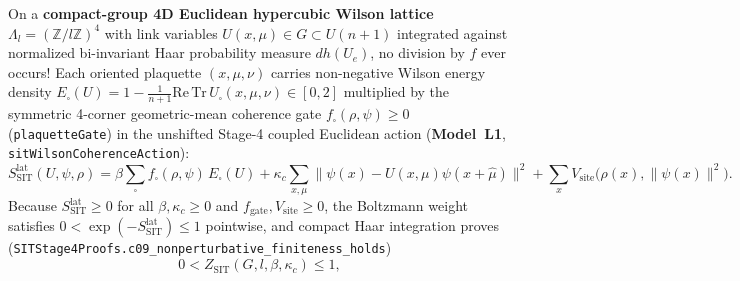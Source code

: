 On a \textbf{compact-group 4D Euclidean hypercubic Wilson lattice} $\Lambda_l = (\mathbb{Z}/l\mathbb{Z})^4$ with link variables $U(x,\mu) \in G \subset U(n+1)$ integrated against normalized bi-invariant Haar probability measure $dh(U_e)$, no division by $f$ ever occurs! Each oriented plaquette $(x,\mu,\nu)$ carries non-negative Wilson energy density $E_\square(U) = 1 - \frac{1}{n+1}\mathrm{Re}\,\mathrm{Tr}\,U_\square(x,\mu,\nu) \in [0, 2]$ multiplied by the symmetric 4-corner geometric-mean coherence gate $f_\square(\rho,\psi) \ge 0$ (\texttt{plaquetteGate}) in the unshifted Stage-4 coupled Euclidean action (\textbf{Model~L1}, \texttt{sit\allowbreak{}Wilson\allowbreak{}Coherence\allowbreak{}Action}):
\begin{equation}
S_{\mathrm{SIT}}^{\mathrm{lat}}(U,\psi,\rho)
= \beta\sum_{\square} f_\square(\rho,\psi)\,E_\square(U)
  + \kappa_c\sum_{x,\mu}\bigl\|\psi(x) - U(x,\mu)\psi(x+\hat{\mu})\bigr\|^2
  + \sum_x V_{\mathrm{site}}\bigl(\rho(x), \|\psi(x)\|^2\bigr).
\label{eq:sec49_coupled_lattice_action}
\end{equation}
Because $S_{\mathrm{SIT}}^{\mathrm{lat}} \ge 0$ for all $\beta, \kappa_c \ge 0$ and $f_{\mathrm{gate}}, V_{\mathrm{site}} \ge 0$, the Boltzmann weight satisfies $0 < \exp(-S_{\mathrm{SIT}}^{\mathrm{lat}}) \le 1$ pointwise, and compact Haar integration proves (\texttt{SITStage4\allowbreak{}Proofs.\allowbreak{}c09\_\allowbreak{}nonperturbative\_\allowbreak{}finiteness\_\allowbreak{}holds})
\begin{equation}
0 < Z_{\mathrm{SIT}}(G, l, \beta, \kappa_c) \le 1,
\label{eq:sec49_Z_bounds}
\end{equation}
